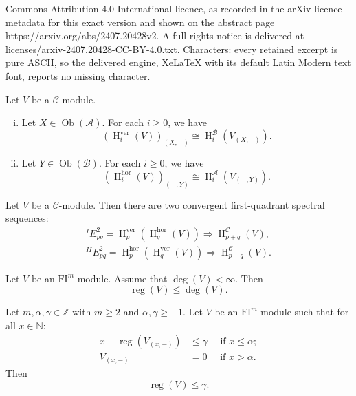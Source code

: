 \documentclass[10pt,a4paper]{amsart}
\DeclareMathOperator{\HH}{H}
\DeclareMathOperator{\Ob}{Ob}
\DeclareMathOperator{\reg}{reg}
\newcommand{\A}{{\mathscr{A}}}
\newcommand{\B}{{\mathscr{B}}}
\newcommand{\C}{{\mathscr{C}}}
\newcommand{\FI}{{\mathrm{FI}}}
\newcommand{\N}{{\mathbb{N}}}
\newcommand{\hor}{{\mathrm{hor}}}
\newcommand{\ver}{{\mathrm{ver}}}
\begin{document}
Commons Attribution 4.0 International licence, as recorded in the arXiv licence metadata for this exact version and shown on the abstract page https://arxiv.org/abs/2407.20428v2. A full rights notice is delivered at licenses/arxiv-2407.20428-CC-BY-4.0.txt. Characters: every retained excerpt is pure ASCII, so the delivered engine, XeLaTeX with its default Latin Modern text font, reports no missing character.
\begin{lemma} \label{homology_and_restrict}
   Let $V$ be a $\C$-module. 
   \begin{enumerate}[(i)]
      \item Let $X\in \Ob(\A)$. For each $i\geqslant 0$, we have
      \[ (\HH^{\ver}_i(V))_{(X,-)} \cong \HH^{\B}_i(V_{(X,-)}). \] 
      \item Let $Y\in \Ob(\B)$. For each $i\geqslant 0$, we have
      \[ (\HH^{\hor}_i(V))_{(-,Y)} \cong \HH^{\A}_i(V_{(-,Y)}). \] 
   \end{enumerate}
\end{lemma}

\begin{theorem} \label{grothendieck}
Let $V$ be a $\C$-module. Then there are two convergent first-quadrant spectral sequences:
\begin{gather*}
^{I}\!E^2_{pq} = \HH^\ver_p (\HH^\hor_q (V)) \Rightarrow \HH^{\C}_{p+q}(V),\\
^{II}\!E^2_{pq} = \HH^\hor_p (\HH^\ver_q (V)) \Rightarrow \HH^{\C}_{p+q}(V).
\end{gather*}
\end{theorem}

\begin{corollary} \label{cor:finite degree case}
   Let $V$ be an $\FI^m$-module. Assume that $\deg(V) < \infty$. Then 
   \[ \reg(V) \leqslant \deg(V). \] 
\end{corollary}

\begin{proposition} \label{prop:2}
   Let $m, \alpha, \gamma \in \mathbb{Z}$ with $m\geqslant 2$ and $\alpha, \gamma \geqslant -1$. Let $V$ be an $\FI^m$-module such that for all $x\in \N$:
   \begin{align*}
      x + \reg\left(V_{(x, -)}\right) &\leqslant \gamma \quad \mbox{ if } x\leqslant \alpha;\\
      V_{(x, -)} &= 0 \quad \mbox{ if } x > \alpha. 
   \end{align*}
   Then 
   \[ \reg(V) \leqslant \gamma. \]
\end{proposition}
\end{document}
